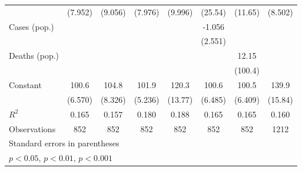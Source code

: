 \documentclass{article}
\begin{document}
{\begin{longtable}{l*{7}{c}}
                &  (7.952)         &  (9.056)         &  (7.976)         &  (9.996)         &  (25.54)         &  (11.65)         &  (8.502)         \\
Cases (pop.)    &                  &                  &                  &                  &   -1.056         &                  &                  \\
                &                  &                  &                  &                  &  (2.551)         &                  &                  \\
Deaths (pop.)   &                  &                  &                  &                  &                  &    12.15         &                  \\
                &                  &                  &                  &                  &                  &  (100.4)         &                  \\
Constant        &    100.6\sym{***}&    104.8\sym{***}&    101.9\sym{***}&    120.3\sym{***}&    100.6\sym{***}&    100.5\sym{***}&    139.9\sym{***}\\
                &  (6.570)         &  (8.326)         &  (5.236)         &  (13.77)         &  (6.485)         &  (6.409)         &  (15.84)         \\
\hline
\(R^{2}\)       &    0.165         &    0.157         &    0.180         &    0.188         &    0.165         &    0.165         &    0.160         \\
Observations    &      852         &      852         &      852         &      852         &      852         &      852         &     1212         \\
\hline\hline
\multicolumn{8}{l}{\footnotesize Standard errors in parentheses}\\
\multicolumn{8}{l}{\footnotesize \sym{*} \(p<0.05\), \sym{**} \(p<0.01\), \sym{***} \(p<0.001\)}\\
\end{longtable}
}
\end{document}
